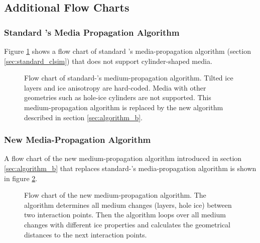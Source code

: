 \subsection{Additional Flow Charts}
\label{sec:flow_charts}

\subsubsection{\texorpdfstring{Standard \clsim's Media Propagation
Algorithm}{Standard 's Media Propagation Algorithm}}\label{standard-s-media-propagation-algorithm}

Figure \ref{fig:rieQu7sh} shows a flow chart of standard \clsim's
media-propagation algorithm (section \ref{sec:standard_clsim}) that does
not support cylinder-shaped media.

\begin{figure}[htbp]
  \caption{Flow chart of standard-\clsim's medium-propagation algorithm. Tilted ice layers and ice anisotropy are hard-coded. Media with other geometries such as hole-ice cylinders are not supported. This medium-propagation algorithm is replaced by the new algorithm described in section \ref{sec:algorithm_b}.}
  \label{fig:rieQu7sh}
\end{figure}

\newpage

\subsubsection{New Media-Propagation
Algorithm}\label{new-media-propagation-algorithm}

A flow chart of the new medium-propagation algorithm introduced in
section \ref{sec:algorithm_b} that replaces standard-\clsim's
media-propagation algorithm is shown in figure \ref{fig:iez4Geih}.

\begin{figure}[htbp]
  \caption{Flow chart of the new medium-propagation algorithm. The algorithm determines all medium changes (layers, hole ice) between two interaction points. Then the algorithm loops over all medium changes with different ice properties and calculates the geometrical distances to the next interaction points.}
  \label{fig:iez4Geih}
\end{figure}

